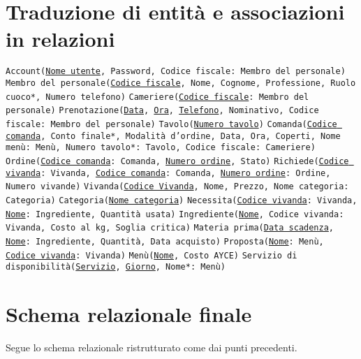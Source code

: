 \documentclass[a4paper,12pt]{report}
\begin{document}
\section{Traduzione di entità e associazioni in relazioni}
%
\texttt{Account(\underline{Nome utente}, Password, Codice fiscale: Membro del personale)}
\newline
\texttt{Membro del personale(\underline{Codice fiscale}, Nome, Cognome, Professione, Ruolo cuoco*, Numero telefono)}
\newline
\texttt{Cameriere(\underline{Codice fiscale}: Membro del personale)}
\newline
\texttt{Prenotazione(\underline{Data}, \underline{Ora}, \underline{Telefono}, Nominativo, Codice fiscale: Membro del personale)}
\newline
\texttt{Tavolo(\underline{Numero tavolo})}
\newline
\texttt{Comanda(\underline{Codice comanda}, Conto finale*, Modalità d'ordine, Data, Ora, Coperti, Nome menù: Menù, Numero tavolo*: Tavolo, Codice fiscale: Cameriere)}
\newline
\texttt{Ordine(\underline{Codice comanda}: Comanda, \underline{Numero ordine}, Stato)}
\newline
\texttt{Richiede(\underline{Codice vivanda}: Vivanda, \underline{Codice comanda}: Comanda, \underline{Numero ordine}: Ordine, Numero vivande)}
\newline
\texttt{Vivanda(\underline{Codice Vivanda}, Nome, Prezzo, Nome categoria: Categoria)}
\newline
\texttt{Categoria(\underline{Nome categoria})}
\newline
\texttt{Necessita(\underline{Codice vivanda}: Vivanda, \underline{Nome}: Ingrediente, Quantità usata)}
\newline
\texttt{Ingrediente(\underline{Nome}, Codice vivanda: Vivanda, Costo al kg, Soglia critica)}
\newline
\texttt{Materia prima(\underline{Data scadenza}, \underline{Nome}: Ingrediente, Quantità, Data acquisto)}
\newline
\texttt{Proposta(\underline{Nome}: Menù, \underline{Codice vivanda}: Vivanda)}
\newline
\texttt{Menù(\underline{Nome}, Costo AYCE)}
\newline
\texttt{Servizio di disponibilità(\underline{Servizio}, \underline{Giorno}, Nome*: Menù)}
\newline
%
\section{Schema relazionale finale}
%
Segue lo schema relazionale ristrutturato come dai punti precedenti.
%
\end{document}
